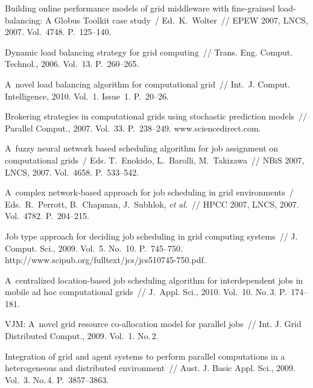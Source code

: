 \begin{multicols}{2}
{{\begin{thebibliography}{99}
  Building online performance models of grid middleware with fine-grained load-balancing: A 
Globus Toolkit case study~/ Ed.\ K.~Wolter~// EPEW 2007, LNCS, 2007. Vol.~4748. P.~125--140.
  
  Dynamic load balancing strategy for grid computing~// Trans. Eng. Comput. 
Technol., 2006. Vol.~13. P.~260--265.
  
   A~novel load balancing algorithm for computational grid~// Int.\ J. Comput.
Intelligence, 2010. Vol.~1. Issue~1. P.~20--26.
  
  Brokering strategies in computational grids using stochastic prediction models~// Parallel 
Comput., 2007. Vol.~33. P.~238--249. {\sf www.sciencedirect.com}.
  
  A~fuzzy neural network based scheduling algorithm for job assignment on computational 
grids~/ Eds. T.~Enokido, L.~Barolli, M.~Takizawa~// NBiS 2007, LNCS, 2007. Vol.~4658. 
P.~533--542.
  
  A~complex network-based approach for job scheduling in grid environments~/ Eds.\ R.~Perrott,
  B.~Chapman, J.~Subhlok, 
\textit{et al}.~// HPCC 2007, LNCS, 2007. Vol.~4782. P.~204--215.
  
  Job type approach for deciding job scheduling in grid computing systems~// J. Comput. 
Sci., 2009. Vol.~5. No.~10. P.~745--750.
  {\sf http://www.scipub.org/fulltext/jcs/jcs510745-750.pdf}.
  
  A~centralized location-based job scheduling algorithm for interdependent jobs in mobile ad hoc 
computational grids~// J.~Appl. Sci., 2010. Vol.~10. No.\,3. P.~174--181.
  
  VJM: A~novel grid resource co-allocation model for parallel jobs~// Int. J. Grid  
Distributed Comput., 2009. Vol.~1. No.\,2.
  
  Integration of grid and agent systems to perform parallel computations in a heterogeneous and 
distributed environment~// Aust. J. Basic Appl. Sci., 2009. Vol.~3. No.\,4. 
P.~3857--3863.
  

\end{thebibliography}}}
\end{multicols}

